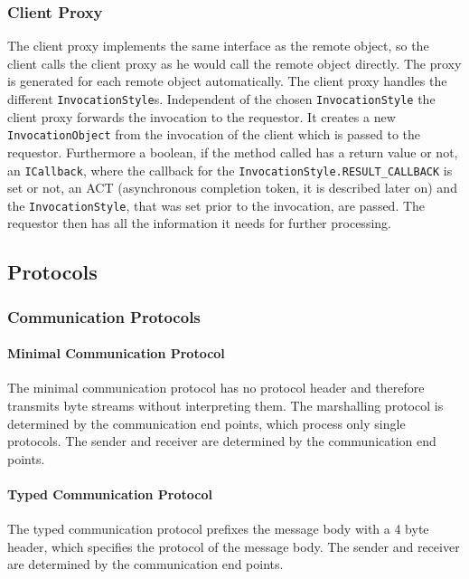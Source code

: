 \subsubsection{Client Proxy}
The client proxy implements the same interface as the remote object, so the client calls the client proxy as he would call the remote object directly. The proxy is generated for each remote object automatically. The client proxy handles the different \texttt{InvocationStyle}s. Independent of the chosen \texttt{InvocationStyle} the client proxy forwards the invocation to the requestor. It creates a new \texttt{InvocationObject} from the invocation of the client which is passed to the requestor. Furthermore a boolean, if the method called has a return value or not, an \texttt{ICallback}, where the callback for the \texttt{InvocationStyle.RESULT_CALLBACK} is set or not, an ACT (asynchronous completion token, it is described later on) and the \texttt{InvocationStyle}, that was set prior to the invocation, are passed. The requestor then has all the information it needs for further processing.


\subsection{Protocols}

\subsubsection{Communication Protocols}

\paragraph{Minimal Communication Protocol}

The minimal communication protocol has no protocol header and therefore transmits byte streams without interpreting them.
The marshalling protocol is determined by the communication end points, which process only single protocols.
The sender and receiver are determined by the communication end points.

\paragraph{Typed Communication Protocol}

The typed communication protocol prefixes the message body with a 4 byte header, which specifies the protocol of the message body.
The sender and receiver are determined by the communication end points.

